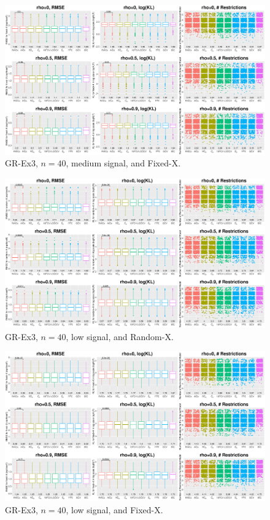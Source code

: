 \begin{figure}[!ht]
\centering
\includegraphics[width=\textwidth]{figures/supplement/fixedx_GR-Ex3_n40_msnr.eps}
\caption{GR-Ex3, $n=40$, medium signal, and Fixed-X.}
\end{figure}
\clearpage
\begin{figure}[!ht]
\centering
\includegraphics[width=\textwidth]{figures/supplement/randomx_GR-Ex3_n40_lsnr.eps}
\caption{GR-Ex3, $n=40$, low signal, and Random-X.}
\end{figure}
\begin{figure}[!ht]
\centering
\includegraphics[width=\textwidth]{figures/supplement/fixedx_GR-Ex3_n40_lsnr.eps}
\caption{GR-Ex3, $n=40$, low signal, and Fixed-X.}
\end{figure}
